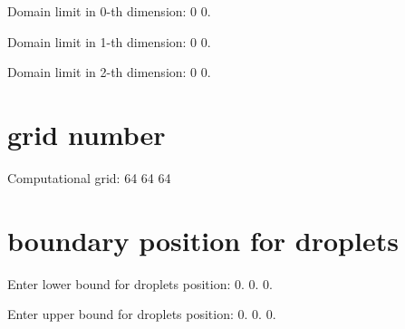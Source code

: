 
\begin{DoxyItemize}
\item Domain limit in 0-\/th dimension\+: 0 0.
\item Domain limit in 1-\/th dimension\+: 0 0.
\item Domain limit in 2-\/th dimension\+: 0 0.
\end{DoxyItemize}

\section*{grid number}


\begin{DoxyItemize}
\item Computational grid\+: 64 64 64
\end{DoxyItemize}

\section*{boundary position for droplets}


\begin{DoxyItemize}
\item Enter lower bound for droplets position\+: 0. 0. 0.
\item Enter upper bound for droplets position\+: 0. 0. 0. 
\end{DoxyItemize}